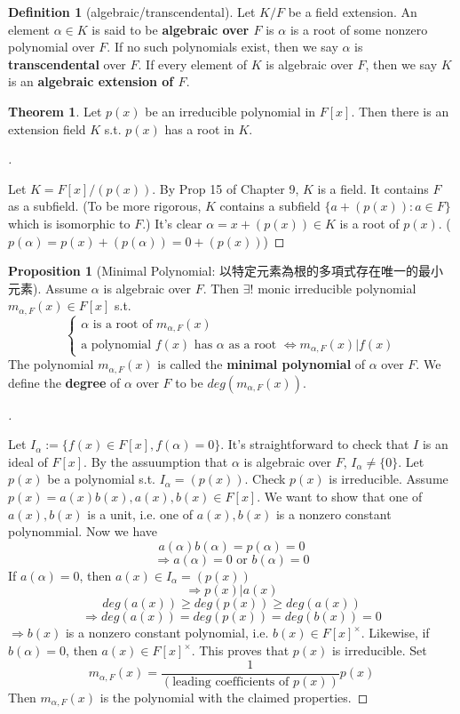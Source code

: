 \documentclass{article}
\theoremstyle{definition}
\newtheorem{thm}{Theorem}
\newtheorem{dfn}{Definition}
\newtheorem{prop}{Proposition}
\newenvironment{proofs}[1][\proofname]{%
  \begin{proof}[#1]$ $\par\nobreak\ignorespaces
}{%
  \end{proof}
}
\begin{document}
\begin{dfn}[algebraic/transcendental]
	Let $K/F$ be a field extension. An element $\alpha \in K$ is said to be \textbf{algebraic over $F$} is $\alpha$ is a root of some nonzero polynomial over $F$.
	If no such polynomials exist, then we say $\alpha$ is \textbf{transcendental} over $F$.
	If every element of $K$ is algebraic over $F$, then we say $K$ is an \textbf{algebraic extension of $F$}.
\end{dfn}

\begin{thm}
	Let $p(x)$ be an irreducible polynomial in $F[x]$. Then there is an extension field $K$ s.t. $p(x)$ has a root in $K$.
\end{thm}

\begin{proofs}
	Let $K = F[x]/(p(x))$.
	By Prop 15 of Chapter 9, $K$ is a field.
	It contains $F$ as a subfield.
	(To be more rigorous, $K$ contains a subfield $\{a + (p(x)): a \in F\}$ which is isomorphic to $F$.)
	It's clear $\alpha = x + (p(x)) \in K$ is a root of $p(x)$.
	($p(\alpha) = p(x) + (p(\alpha)) = 0 + (p(x))$)
\end{proofs}

\begin{prop}[Minimal Polynomial: 以特定元素為根的多項式存在唯一的最小元素]
	Assume $\alpha$ is algebraic over $F$.
	Then $\exists !$ monic irreducible polynomial $m_{\alpha, F}(x) \in F[x]$ s.t.
	\[
		\begin{cases}
			\alpha \text{ is a root of } m_{\alpha, F}(x) \\
			\text{a polynomial } f(x) \text{ has } \alpha \text{ as a root } \Leftrightarrow m_{\alpha, F}(x) | f(x)
		\end{cases}
	\]
	The polynomial $m_{\alpha, F}(x)$ is called the \textbf{minimal polynomial} of $\alpha$ over $F$.
	We define the \textbf{degree} of $\alpha$ over $F$ to be $deg(m_{\alpha, F}(x))$.
\end{prop}

\begin{proofs}
	Let $I_\alpha := \{f(x) \in F[x], f(\alpha) = 0\}$.
	It's straightforward to check that $I$ is an ideal of $F[x]$.
	By the assuumption that $\alpha$ is algebraic over $F$, $I_\alpha \neq \{0\}$.
	Let $p(x)$ be a polynomial s.t. $I_\alpha = (p(x))$.
	Check $p(x)$ is irreducible.
	Assume $p(x) = a(x) b(x), a(x), b(x) \in F[x]$.
	We want to show that one of $a(x), b(x)$ is a unit, i.e. one of $a(x), b(x)$ is a nonzero constant polynommial.
	Now we have
	\[
		a(\alpha) b(\alpha) = p(\alpha) = 0
	\]
	\[
		\Rightarrow a(\alpha) = 0 \text{ or } b(\alpha) = 0
	\]
	If $a(\alpha) = 0$, then $a(x) \in I_\alpha = (p(x))$
	\[
		\Rightarrow p(x) | a(x)
	\]
	\[
		deg(a(x)) \geq deg(p(x)) \geq deg(a(x))
	\]
	\[
		\Rightarrow deg(a(x)) = deg(p(x)) = deg(b(x)) = 0
	\]
	$\Rightarrow b(x)$ is a nonzero constant polynomial, i.e. $b(x) \in F[x]^\times$.
	Likewise, if $b(\alpha) = 0$, then $a(x) \in F[x]^\times$.
	This proves that $p(x)$ is irreducible.
	Set
	\[
		m_{\alpha, F}(x) = \frac{1}{(\text{leading coefficients of }p(x))} p(x)
	\]
	Then $m_{\alpha, F}(x)$ is the polynomial with the claimed properties.
\end{proofs}
\end{document}
